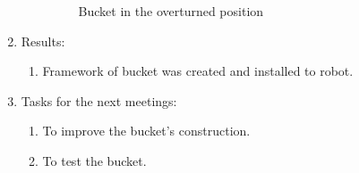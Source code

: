 \begin{enumerate}
\begin{enumerate}
\begin{figure}[H]
\begin{minipage}[h]{0.47\linewidth}
				\caption{Bucket in the overturned position}
			\end{minipage}
		\end{figure}
		
	\end{enumerate}
	
	\item Results:
	\begin{enumerate}
		\item Framework of bucket was created and installed to robot.
		
	\end{enumerate}
	
	\item Tasks for the next meetings:
	\begin{enumerate}
		\item To improve the bucket's construction.
		
		\item To test the bucket.
		
	\end{enumerate}     
\end{enumerate}
\fillpage

